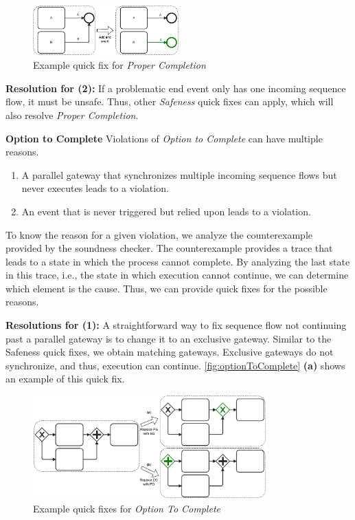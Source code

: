 \documentclass[runningheads]{llncs}
\newcommand{\subpart}[1]{\vspace{1em}\noindent\textbf{#1}}
\begin{document}
\begin{figure}[ht]
	\centering
	\includegraphics[width=0.5\textwidth]{images/properCompletion}
	\caption{Example quick fix for \textit{Proper Completion}}
	\label{fig:properCompletion}
\end{figure}

\textbf{Resolution for (2):} If a problematic end event only has one incoming sequence flow, it must be unsafe.
Thus, other \textit{Safeness} quick fixes can apply, which will also resolve \textit{Proper Completion}.

\subpart{Option to Complete}
Violations of \textit{Option to Complete} can have multiple reasons.

\begin{enumerate}
	\item A parallel gateway that synchronizes multiple incoming sequence flows but never executes leads to a violation.
	\item An event that is never triggered but relied upon leads to a violation.
\end{enumerate}

To know the reason for a given violation, we analyze the counterexample provided by the soundness checker.
The counterexample provides a trace that leads to a state in which the process cannot complete.
By analyzing the last state in this trace, i.e., the state in which execution cannot continue, we can determine which element is the cause.
Thus, we can provide quick fixes for the possible reasons.

\textbf{Resolutions for (1):} A straightforward way to fix sequence flow not continuing past a parallel gateway is to change it to an exclusive gateway.
Similar to the Safeness quick fixes, we obtain matching gateways.
Exclusive gateways do not synchronize, and thus, execution can continue.
\autoref{fig:optionToComplete} \textbf{(a)} shows an example of this quick fix.

\begin{figure}[ht]
	\centering
	\includegraphics[width=0.8\textwidth]{images/optionToComplete}
	\caption{Example quick fixes for \textit{Option To Complete}}
	\label{fig:optionToComplete}
\end{figure}
\end{document}
